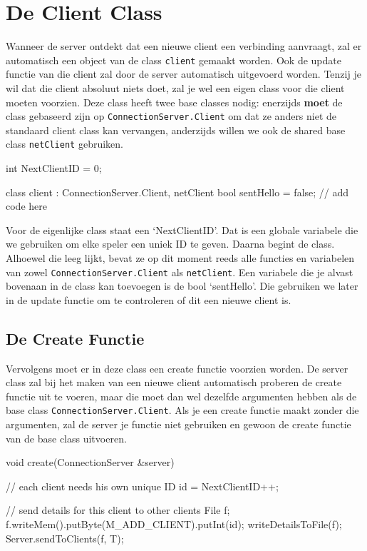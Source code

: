 \section{De Client Class}

Wanneer de server ontdekt dat een nieuwe client een verbinding aanvraagt, zal er automatisch een object van de class \texttt{client} gemaakt worden. Ook de update functie van die client zal door de server automatisch uitgevoerd worden. Tenzij je wil dat die client absoluut niets doet, zal je wel een eigen class voor die client moeten voorzien. Deze class heeft twee base classes nodig: enerzijds \textbf{moet} de class gebaseerd zijn op \texttt{ConnectionServer.Client} om dat ze anders niet de standaard client class kan vervangen, anderzijds willen we ook de shared base class \texttt{netClient} gebruiken.

\begin{code}
int NextClientID = 0;

class client : ConnectionServer.Client, netClient 
{
  bool sentHello = false; 
	// add code here
}
\end{code}

\begin{note}
Voor de eigenlijke class staat een  `NextClientID'. Dat is een globale variabele die we gebruiken om elke speler een uniek ID te geven. Daarna begint de class. Alhoewel die leeg lijkt, bevat ze op dit moment reeds alle functies en variabelen van zowel \texttt{ConnectionServer.Client} als \texttt{netClient}. Een variabele die je alvast bovenaan in de class kan toevoegen is de bool `sentHello'. Die gebruiken we later in de update functie om te controleren of dit een nieuwe client is.
\end{note}

\subsection{De Create Functie}

Vervolgens moet er in deze class een create functie voorzien worden. De server class zal bij het maken van een nieuwe client automatisch proberen de create functie uit te voeren, maar die moet dan wel dezelfde argumenten hebben als de base class \texttt{ConnectionServer.Client}. Als je een create functie maakt zonder die argumenten, zal de server je functie niet gebruiken en gewoon de create functie van de base class uitvoeren.

\begin{code}
void create(ConnectionServer &server)
{     
	// each client needs his own unique ID
	id = NextClientID++;
	
	// send details for this client to other clients
	File f;
	f.writeMem().putByte(M_ADD_CLIENT).putInt(id);
	writeDetailsToFile(f);
	Server.sendToClients(f, T);
}
\end{code}

